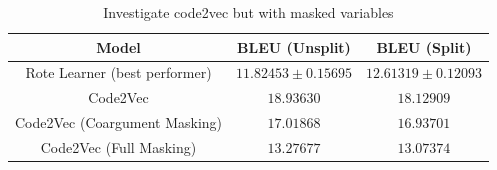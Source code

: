 \begin{table}[ht!]
\begin{center}
\begin{tabular}{ c | c | c }
    Model                             & BLEU (Unsplit)  & BLEU (Split)    \\
    \hline
    Rote Learner (best performer)          & $ 11.82453 \pm  0.15695 $ & $ 12.61319 \pm 0.12093 $ \\
    \hline
    Code2Vec                               & $ 18.93630 $ & $ 18.12909 $ \\
    Code2Vec  (Coargument Masking)              & $ 17.01868 $ & $ 16.93701 $ \\                  
    Code2Vec  (Full Masking)                & $ 13.27677 $ & $ 13.07374 $ \\

    \hline
\end{tabular}
\caption {Investigate code2vec but with masked variables}
\label{table:code_2_vec_masked}
\end{center}
\end{table}


